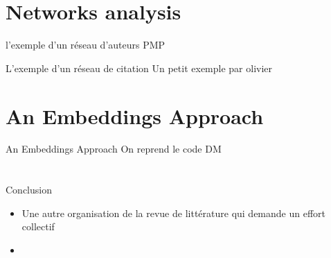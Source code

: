 \documentclass[
  9pt,
  ignorenonframetext,
  aspectratio=54,
]{beamer}
\begin{document}
\hypertarget{networks-analysis}{%
\section{Networks analysis}\label{networks-analysis}}

\begin{frame}{l'exemple d'un réseau d'auteurs}
\protect\hypertarget{lexemple-dun-ruxe9seau-dauteurs}{}
PMP
\end{frame}

\begin{frame}{L'exemple d'un réseau de citation}
\protect\hypertarget{lexemple-dun-ruxe9seau-de-citation}{}
Un petit exemple par olivier
\end{frame}

\hypertarget{an-embeddings-approach}{%
\section{An Embeddings Approach}\label{an-embeddings-approach}}

\begin{frame}{An Embeddings Approach}
On reprend le code DM
\end{frame}

\hypertarget{section}{%
\section{}\label{section}}

\begin{frame}{}
Conclusion

\begin{itemize}
\item
  Une autre organisation de la revue de littérature qui demande un
  effort collectif
\item
\end{itemize}
\end{frame}
\end{document}
